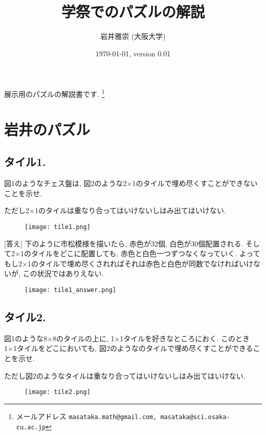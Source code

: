 \documentclass[dvipdfmx,a4paper,12pt]{article} %
\title{学祭でのパズルの解説}
\author{岩井雅崇 (大阪大学)}
\date{\today, version 0.01}
\theoremstyle{definition}
\theoremstyle{remark}
\numberwithin{equation}{section}
\begin{document}
\maketitle 

展示用のパズルの解説書です. 
\footnote{メールアドレス {\tt masataka.math@gmail.com, masataka@sci.osaka-cu.ac.jp}}

\section{岩井のパズル}
\subsection{タイル1. }
\begin{tcolorbox}[mybox]
図1のようなチェス盤は, 図2のような2×1のタイルで埋め尽くすことができないことを示せ.

ただし2×1のタイルは重なり合ってはいけないしはみ出てはいけない.
\end{tcolorbox}
\begin{figure}[htbp]
\begin{center}
\texttt{[image: tile1.png]}
\end{center}
\end{figure}

[答え]
下のように市松模様を描いたら, 赤色が32個, 白色が30個配置される.
そして2×1のタイルをどこに配置しても, 赤色と白色一つずつなくなっていく. 
よってもし2×1のタイルで埋め尽くされればそれは赤色と白色が同数でなければいけないが, この状況ではありえない.

\begin{figure}[htbp]
\begin{center}
\texttt{[image: tile1\_answer.png]}
\end{center}
\end{figure}


\subsection{タイル2. }

\begin{tcolorbox}[mybox]
図1のような8×8のタイルの上に, 1×1タイルを好きなところにおく. 
このとき1×1タイルをどこにおいても, 図2のようなのタイルで埋め尽くすことができることを示せ.

ただし図2のようなタイルは重なり合ってはいけないしはみ出てはいけない.
\end{tcolorbox}

\begin{figure}[htbp]
\begin{center}
\texttt{[image: tile2.png]}
\end{center}
\end{figure}
\end{document}
